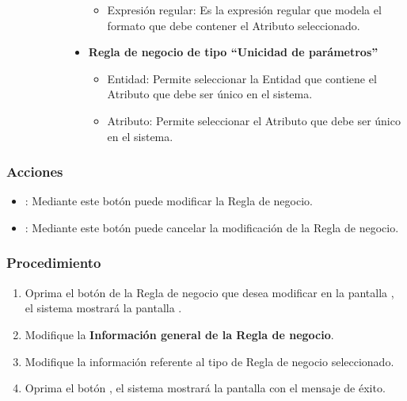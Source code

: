 \begin{description}
\begin{description}
\begin{itemize}
\begin{itemize}
			\item Expresión regular: Es la expresión regular que modela el formato que debe contener el Atributo seleccionado.
		  \end{itemize}
		  \item \textbf{Regla de negocio de tipo ``Unicidad de parámetros''}
		  \begin{itemize}
			\item Entidad: Permite seleccionar la Entidad que contiene el Atributo que debe ser único en el sistema.
			\item Atributo: Permite seleccionar el Atributo que debe ser único en el sistema.
		  \end{itemize}
	    \end{itemize}
	 \end{description}
\end{description}

\subsubsection{Acciones}
\begin{itemize}
 \item {}: Mediante este botón puede modificar la Regla de negocio.
 \item {}: Mediante este botón puede cancelar la modificación de la Regla de negocio.
\end{itemize}
	
	
\subsubsection{Procedimiento}
\begin{enumerate}
	\item Oprima el botón \btnEditar de la Regla de negocio que desea modificar en la pantalla , el sistema mostrará la pantalla . 

	
	\item Modifique la \textbf{Información general de la Regla de negocio}.
	
	\item Modifique la información referente al tipo de Regla de negocio seleccionado.
	
	\item Oprima el botón , el sistema mostrará la pantalla  con el mensaje de éxito.
\end{enumerate}


